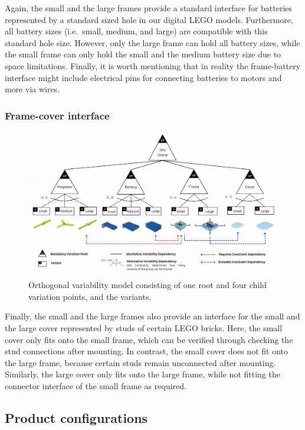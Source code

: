 \documentclass[sigconf,review]{acmart}
\begin{document}
Again, the small and the large frames provide a standard interface for batteries represented by a standard sized hole in our digital LEGO models.
Furthermore, all battery sizes (i.e.\ small, medium, and large) are compatible with this standard hole size.
However, only the large frame can hold all battery sizes, while the small frame can only hold the small and the medium battery size due to space limitations.
Finally, it is worth mentioning that in reality the frame-battery interface might include electrical pins for connecting batteries to motors and more via wires.

\subsubsection*{Frame-cover interface}

\begin{figure}[tbp]
    \includegraphics[width=\textwidth]{./FeatureTreeWithLegend3.jpg}
    \caption{Orthogonal variability model consisting of one root and four child variation points, and the variants.}
    \label{fig:feature-tree}
\end{figure}

Finally, the small and the large frames also provide an interface for the small and the large cover represented by studs of certain LEGO bricks.
Here, the small cover only fits onto the small frame, which can be verified through checking the stud connections after mounting.
In contrast, the small cover does not fit onto the large frame, because certain studs remain unconnected after mounting.
Similarly, the large cover only fits onto the large frame, while not fitting the connector interface of the small frame as required.

\subsection{Product configurations}
\label{sec:configuration-options}
\end{document}
